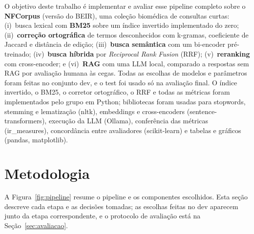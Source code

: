 \documentclass[10pt,a4paper]{article}
\begin{document}
O objetivo deste trabalho é implementar e avaliar esse pipeline completo sobre o \textbf{NFCorpus} (versão do BEIR), uma coleção biomédica de consultas curtas: (i)~busca lexical com \textbf{BM25} sobre um índice invertido implementado do zero; (ii)~\textbf{correção ortográfica} de termos desconhecidos com k-gramas, coeficiente de Jaccard e distância de edição; (iii)~\textbf{busca semântica} com um bi-encoder pré-treinado; (iv)~\textbf{busca híbrida} por \emph{Reciprocal Rank Fusion} (RRF); (v)~\textbf{reranking} com cross-encoder; e (vi)~\textbf{RAG} com uma LLM local, comparado a respostas sem RAG por avaliação humana às cegas. Todas as escolhas de modelos e parâmetros foram feitas no conjunto dev, e o test foi usado só na avaliação final. O índice invertido, o BM25, o corretor ortográfico, o RRF e todas as métricas foram implementados pelo grupo em Python; bibliotecas foram usadas para stopwords, stemming e lematização (nltk), embeddings e cross-encoders (sentence-transformers), execução da LLM (Ollama), conferência das métricas (ir\_measures), concordância entre avaliadores (scikit-learn) e tabelas e gráficos (pandas, matplotlib).

\section{Metodologia}

A Figura~\ref{fig:pipeline} resume o pipeline e os componentes escolhidos. Esta seção descreve cada etapa e as decisões tomadas; as escolhas feitas no dev aparecem junto da etapa correspondente, e o protocolo de avaliação está na Seção~\ref{sec:avaliacao}.
\end{document}
